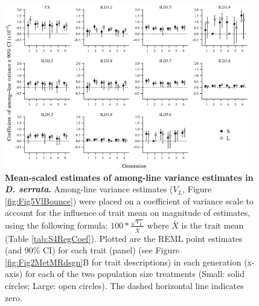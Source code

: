 \begin{figure}
    \centering
    \includegraphics[width=0.95\textwidth]{Supp/Chp2_Meta/S6_CVM.eps}
    \caption[Mean-scaled estimates of among-line variance estimates in \textit{D. serrata}.]{\textbf{Mean-scaled estimates of among-line variance estimates in \textit{D. serrata}.} Among-line variance estimates ($V_L$, Figure \ref{fig:Fig5VlBounce}) were placed on a coefficient of variance scale to account for the influence of trait mean on magnitude of estimates, using the following formula: $100*\frac{\sqrt{V_L}}{\bar{X}}$ where $\bar{X}$ is the trait mean (Table \ref{tab:S4RegCoef}). Plotted are the REML point estimates (and 90\% CI) for each trait (panel) (see Figure \ref{fig:Fig2MetMRdsgn}B for trait descriptions) in each generation (x-axis) for each of the two population size treatments (Small: solid circles; Large: open circles). The dashed horizontal line indicates zero.}
    \label{fig:S6CVM}
\end{figure}


